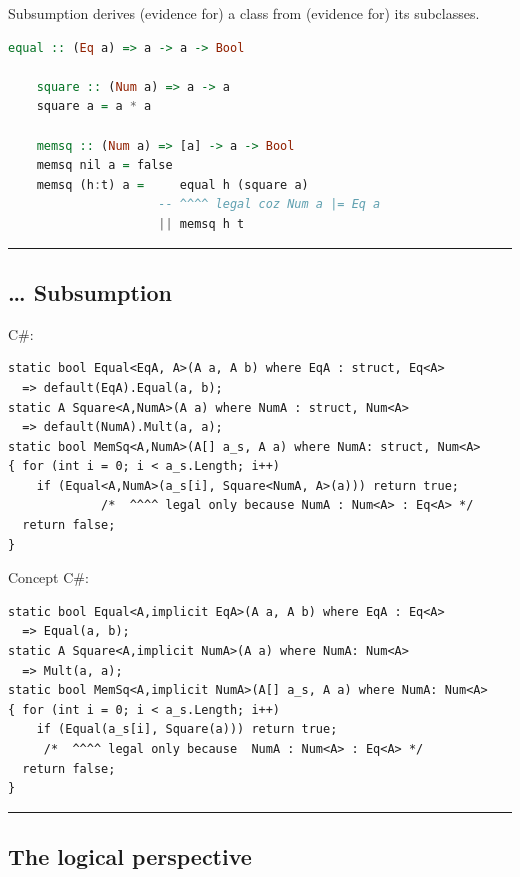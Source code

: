 Subsumption derives (evidence for) a class from (evidence for) its
subclasses.

\begin{lstlisting}[language=Haskell]
    equal :: (Eq a) => a -> a -> Bool

    square :: (Num a) => a -> a 
    square a = a * a

    memsq :: (Num a) => [a] -> a -> Bool
    memsq nil a = false
    memsq (h:t) a =     equal h (square a) 
                     -- ^^^^ legal coz Num a |= Eq a 
                     || memsq h t
\end{lstlisting}

\begin{center}\rule{0.5\linewidth}{\linethickness}\end{center}

\subsection{\ldots{} Subsumption}\label{subsumption-1}

C\#:

\begin{lstlisting}
static bool Equal<EqA, A>(A a, A b) where EqA : struct, Eq<A> 
  => default(EqA).Equal(a, b);
static A Square<A,NumA>(A a) where NumA : struct, Num<A> 
  => default(NumA).Mult(a, a);
static bool MemSq<A,NumA>(A[] a_s, A a) where NumA: struct, Num<A>
{ for (int i = 0; i < a_s.Length; i++) 
    if (Equal<A,NumA>(a_s[i], Square<NumA, A>(a))) return true;
             /*  ^^^^ legal only because NumA : Num<A> : Eq<A> */
  return false;
}
\end{lstlisting}

Concept C\#:

\begin{lstlisting}
static bool Equal<A,implicit EqA>(A a, A b) where EqA : Eq<A> 
  => Equal(a, b);
static A Square<A,implicit NumA>(A a) where NumA: Num<A> 
  => Mult(a, a);
static bool MemSq<A,implicit NumA>(A[] a_s, A a) where NumA: Num<A>
{ for (int i = 0; i < a_s.Length; i++) 
    if (Equal(a_s[i], Square(a))) return true;
     /*  ^^^^ legal only because  NumA : Num<A> : Eq<A> */
  return false;
}
\end{lstlisting}

\begin{center}\rule{0.5\linewidth}{\linethickness}\end{center}

\subsection{The logical perspective}\label{the-logical-perspective}

